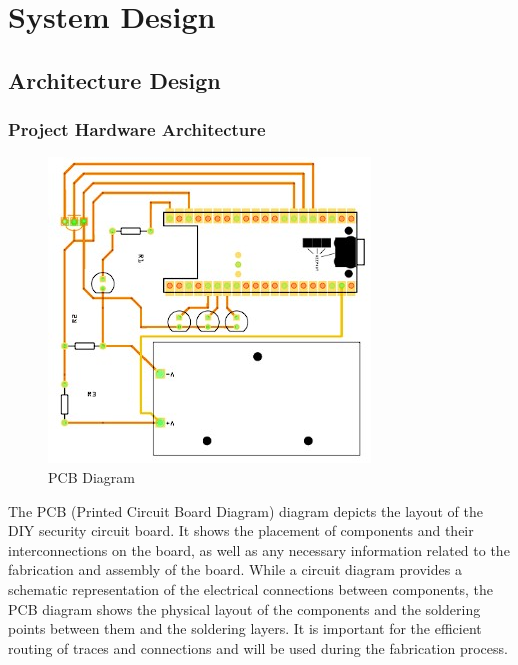 \section{System Design}\label{sec:system-design}

\subsection{Architecture Design}\label{subsec:architecture-design}

\subsubsection{Project Hardware Architecture}

\begin{figure}[htbp]
    \centering
    \includegraphics[width=0.8\linewidth]{images/pcbDiagram}
    \caption{PCB Diagram}
    \label{fig:pcbDiagram}
\end{figure}

The PCB (Printed Circuit Board Diagram) diagram depicts the layout of the DIY security
circuit board. %
It shows the placement of components and their interconnections on the board, as well as any necessary information related to the fabrication and assembly of
the board. %
While a circuit diagram provides a schematic representation of the electrical connections between components, the PCB diagram shows the physical layout of the
components and the soldering points between them and the soldering layers. %
It is
important for the efficient routing of traces and connections and will be used during
the fabrication process. %

